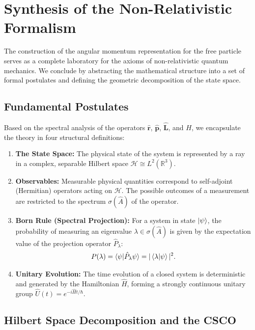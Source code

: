 \section{Synthesis of the Non-Relativistic Formalism}

The construction of the angular momentum representation for the free particle
serves as a complete laboratory for the axioms of non-relativistic quantum
mechanics. We conclude by abstracting the mathematical structure into a set of
formal postulates and defining the geometric decomposition of the state space.

\subsection{Fundamental Postulates}

Based on the spectral analysis of the operators $\hat{\mathbf{r}}$,
$\hat{\mathbf{p}}$, $\hat{\mathbf{L}}$, and $\hat{H}$, we encapsulate the theory
in four structural definitions:

\begin{enumerate}
	\item \textbf{The State Space:} The physical state of the system is
		represented by a ray in a complex, separable Hilbert space $\mathcal{H}
		\cong L^2(\mathbb{R}^3)$.
	\item \textbf{Observables:} Measurable physical quantities correspond to
		self-adjoint (Hermitian) operators acting on $\mathcal{H}$. The possible
		outcomes of a measurement are restricted to the spectrum $\sigma(\hat{A})$
		of the operator.
	\item \textbf{Born Rule (Spectral Projection):} For a system in state
		$\ket{\psi}$, the probability of measuring an eigenvalue $\lambda \in
		\sigma(\hat{A})$ is given by the expectation value of the projection
		operator $\hat{P}_\lambda$:
		\begin{equation}
			P(\lambda) = \braket{\psi | \hat{P}_\lambda \psi} =
			|\braket{\lambda | \psi}|^2.
		\end{equation}
	\item \textbf{Unitary Evolution:} The time evolution of a closed system is
		deterministic and generated by the Hamiltonian $\hat{H}$, forming a strongly
		continuous unitary group $\hat{U}(t) = e^{-i\hat{H}t/\hbar}$.
\end{enumerate}

\subsection{Hilbert Space Decomposition and the CSCO}


